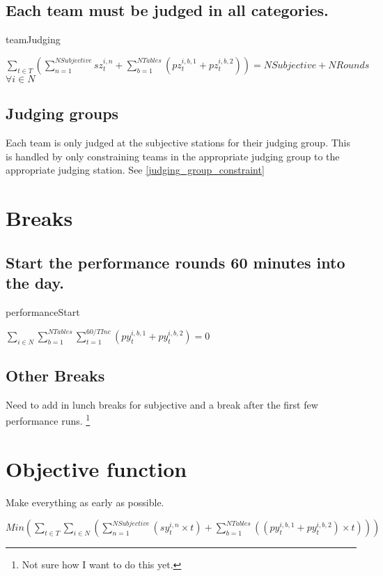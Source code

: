 \documentclass[letterpaper,11pt]{report}
\newcommand{\doccomment}[3]%
{\marginpar{\textcolor{#2}{\bf #1}}%
\footnote{{\color{#2}#3}}%
}
\newcommand{\doccomment}[3]{}
\newcommand{\jpscomment}[1]%
{\doccomment{SCHEWE}{Bittersweet}{#1}}
\begin{document}
\FloatBarrier
\subsection{Each team must be judged in all categories.}
\begin{algorithm}
\caption{teamJudging}
$\sum\limits_{t \in T} ( 
    \sum\limits_{n=1}^{NSubjective} sz_{t}^{i,n}  
 + \sum\limits_{b=1}^{NTables} (pz_{t}^{i,b,1} + pz_{t}^{i,b,2})
)
= NSubjective + NRounds$
\hfill $\forall i \in N$
\end{algorithm}

\FloatBarrier
\subsection{Judging groups}
Each team is only judged at the subjective stations for their judging
group. This is handled by only constraining teams in the appropriate
judging group to the appropriate judging station. See \autoref{judging_group_constraint}


\FloatBarrier
\section{Breaks}
\subsection{Start the performance rounds 60 minutes into the day.}
\begin{algorithm}
\caption{performanceStart}
$\sum\limits_{i \in N} \sum\limits_{b=1}^{NTables} 
    \sum\limits_{t = 1}^{60/TInc} 
      ( py_{t}^{i,b,1} + py_{t}^{i,b,2} ) = 0$
\end{algorithm}
    
\subsection{Other Breaks}
Need to add in lunch breaks for subjective and a break after the first few
performance runs. \jpscomment{Not sure how I want to do this yet.}

\section{Objective function}
Make everything as early as possible.

$Min ( 
\sum\limits_{t \in T}
  \sum\limits_{i \in N} (
    \sum\limits_{n=1}^{NSubjective}
      ( sy_{t}^{i,n} \times t )
  + \sum\limits_{b=1}^{NTables} ( ( py_{t}^{i,b,1} + py_{t}^{i,b,2} )
  \times t)
  )
) $
\end{document}
